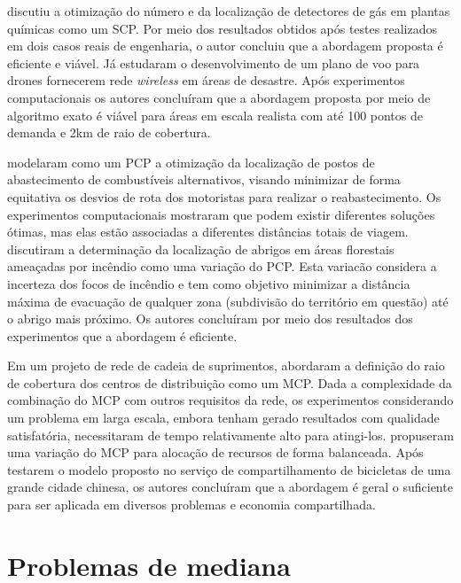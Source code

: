 


\textcite{Vianna2019} discutiu a otimização do número e da localização de detectores de gás em plantas químicas como um SCP. Por meio dos resultados obtidos após testes realizados em dois casos reais de engenharia, o autor concluiu que a abordagem proposta é eficiente e viável. Já \textcite{Park2020} estudaram o desenvolvimento de um plano de voo para drones fornecerem rede \textit{wireless} em áreas de desastre. Após experimentos computacionais os autores concluíram que a abordagem proposta por meio de algoritmo exato é viável para áreas em escala realista com até 100 pontos de demanda e 2km de raio de cobertura.

\textcite{Lin2018} modelaram como um PCP a otimização da localização de postos de abastecimento de combustíveis alternativos, visando minimizar de forma equitativa os desvios de rota dos motoristas para realizar o reabastecimento. Os experimentos computacionais mostraram que podem existir diferentes soluções ótimas, mas elas estão associadas a diferentes distâncias totais de viagem. \textcite{Demange2020} discutiram a determinação da localização de abrigos em áreas florestais ameaçadas por incêndio como uma variação do PCP. Esta variacão considera a incerteza dos focos de incêndio e tem como objetivo minimizar a distância máxima de evacuação de qualquer zona (subdivisão do território em questão) até o abrigo mais próximo. Os autores concluíram por meio dos resultados dos experimentos que a abordagem é eficiente.

Em um projeto de rede de cadeia de suprimentos, \textcite{Rahmani2018} abordaram a definição do raio de cobertura dos centros de distribuição como um MCP. Dada a complexidade da combinação do MCP com outros requisitos da rede, os experimentos considerando um problema em larga escala, embora tenham gerado resultados com qualidade satisfatória, necessitaram de tempo relativamente alto para atingi-los. \textcite{Muren2020} propuseram uma variação do MCP para alocação de recursos de forma balanceada. Após testarem o modelo proposto no serviço de compartilhamento de bicicletas de uma grande cidade chinesa, os autores concluíram que a abordagem é geral o suficiente para ser aplicada em diversos problemas e economia compartilhada.

\section{Problemas de mediana}

